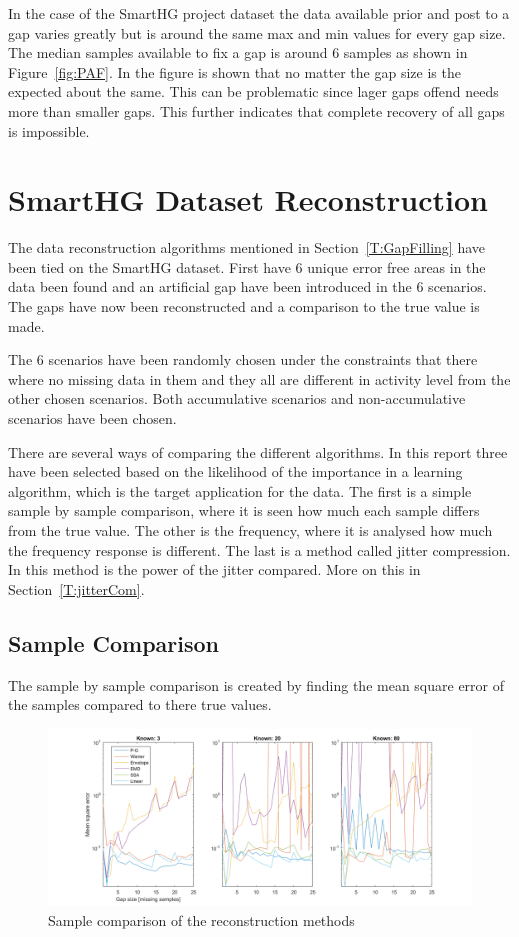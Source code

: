 In the case of the SmartHG project dataset the data available prior and post to a gap varies greatly but is around the same max and min values for every gap size. The median samples available to fix a gap is around 6 samples as shown in Figure~\ref{fig:PAF}. In the figure is shown that no matter the gap size is the expected  about the same. This can be problematic since lager gaps offend needs more  than smaller gaps. This further indicates that complete recovery of all gaps is impossible. 

\section{SmartHG Dataset Reconstruction}
The data reconstruction algorithms mentioned in Section~\ref{T:GapFilling} have been tied on the SmartHG dataset. First have 6 unique error free areas in the data been found and an artificial gap have been introduced in the 6 scenarios. 
The gaps have now been reconstructed and a comparison to the true value is made. 

The 6 scenarios have been randomly chosen under the constraints that there where no missing data in them and they all are different in activity level from the other chosen scenarios. Both accumulative scenarios and non-accumulative scenarios have been chosen. 

There are several ways of comparing the different algorithms. In this report three have been selected based on the likelihood of the importance in a learning algorithm, which is the target application for the data. The first is a simple sample by sample comparison, where it is seen how much each sample differs from the true value. The other is the frequency, where it is analysed how much the frequency response is different. The last is a method called jitter compression. In this method is the power of the jitter compared. More on this in Section~\ref{T:jitterCom}.

\subsection{Sample Comparison}
The sample by sample comparison is created by finding the mean square error of the samples compared to there true values.  

\begin{figure}[H]
\centering
\includegraphics[width=1\textwidth]{billeder/RecNorm.png}
\caption{Sample comparison of the reconstruction methods}
\label{fig:RecNorm}
\end{figure}


